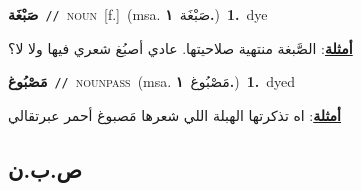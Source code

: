 \documentclass[10pt,a4paper,twoside]{article} %
\begin{document}
\begin{multicols}{2}
{\setlength\topsep{0pt}\textbf{\foreignlanguage{arabic}{صَبْغَة}}\ {\color{gray}\texttt{//}\color{black}}\ \textsc{noun}\ [f.]\ \color{gray}(msa. \foreignlanguage{arabic}{صَبْغَة}~\foreignlanguage{arabic}{\textbf{١.}})\color{black}\ \textbf{1.}~dye\  \begin{flushright}\color{gray}\foreignlanguage{arabic}{\textbf{\underline{\foreignlanguage{arabic}{أمثلة}}}: الصَّبغة منتهية صلاحيتها. عادي أصبُغ شعري فيها ولا لا؟}\end{flushright}\color{black}} \vspace{2mm}

{\setlength\topsep{0pt}\textbf{\foreignlanguage{arabic}{مَصْبُوغ}}\ {\color{gray}\texttt{//}\color{black}}\ \textsc{noun\textunderscore pass}\ \color{gray}(msa. \foreignlanguage{arabic}{مَصْبُوغ}~\foreignlanguage{arabic}{\textbf{١.}})\color{black}\ \textbf{1.}~dyed\  \begin{flushright}\color{gray}\foreignlanguage{arabic}{\textbf{\underline{\foreignlanguage{arabic}{أمثلة}}}: اه تذكرتها الهبلة اللي شعرها مَصبوغ أحمر عبرتقالي}\end{flushright}\color{black}} \vspace{2mm}

\vspace{-3mm}
\subsection*{\color{blue}\foreignlanguage{arabic}{ص.ب.ن}\color{blue}{}} 


\end{multicols}
\end{document}

